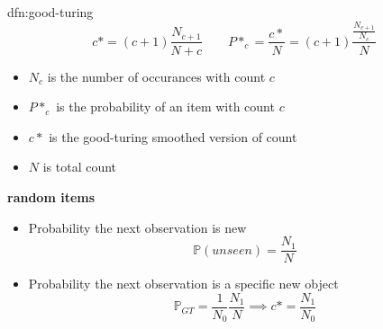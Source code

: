 \documentclass[landscape, 8pt]{extarticle}
\begin{document}
\begin{multicols}{3}
\begin{dfn}{dfn:good-turing}{}
    \[c* = (c + 1) \frac{N_{c+1}}{N+c} \qquad P*_{c} = \frac{c*}{N} = (c + 1) \frac{\frac{N_{c+1}}{N_{c}}}{N}\]

    \begin{itemize}[leftmargin=*]
        \setlength\itemsep{0em}
        \item $N_{c}$ is the number of occurances with count $c$
        \item $P*_{c}$ is the probability of an item with count $c$
        \item $c*$ is the good-turing smoothed version of count
        \item $N$ is total count
    \end{itemize}

    \textbf{random items}
    \begin{itemize}
        \setlength\itemsep{0em}
        \item Probability the next observation is new
            \[\mathbb{P}(unseen) = \frac{N_{1}}{N}\]
        \item Probability the next observation is a specific new object
            \[\mathbb{P}_{GT} = \frac{1}{N_{0}} \frac{N_{1}}{N} \implies c* = \frac{N_{1}}{N_{0}}\]
    \end{itemize}
\end{dfn}

\lipsum[1-12]
\end{multicols}
\end{document}
